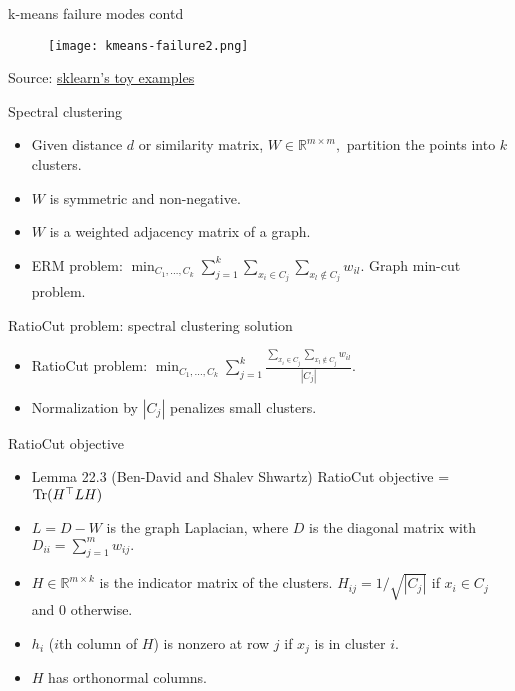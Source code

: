 \documentclass[final]{beamer}
\begin{document}
\begin{frame}{k-means failure modes contd}
	\begin{figure}
	\texttt{[image: kmeans-failure2.png]}
	\end{figure}

	Source: \href{https://scikit-learn.org/stable/auto_examples/cluster/plot_kmeans_assumptions.html\#sphx-glr-auto-examples-cluster-plot-kmeans-assumptions-py}{sklearn's toy examples}
\end{frame}
\begin{frame}{Spectral clustering}
	\begin{itemize}
		\item Given distance $d$ or similarity matrix, $W \in \mathbb{R}^{m\times m},$ partition the points into $k$ clusters.
		\pause
		\item $W$ is symmetric and non-negative.
		\pause
		\item $W$ is a weighted adjacency matrix of a graph.
		\pause
		\item ERM problem: $\min_{C_1, \ldots, C_k} \sum_{j=1}^k \sum_{x_i \in C_j} \sum_{x_l \notin C_j} w_{il}.$ Graph min-cut problem.
	\end{itemize}
\end{frame}
\begin{frame}{RatioCut problem: spectral clustering solution}
	\begin{itemize}
		\item RatioCut problem: $\min_{C_1, \ldots, C_k} \sum_{j=1}^k \frac{\sum_{x_i \in C_j} \sum_{x_l \notin C_j} w_{il}}{|C_j|}.$
		\pause
		\item Normalization by $|C_j|$ penalizes small clusters.
		\pause

	\end{itemize}

\end{frame}
\begin{frame}{RatioCut objective}
	\begin{itemize}
\item Lemma 22.3 (Ben-David and Shalev Shwartz) RatioCut objective = ${\rm Tr}(H^\top L H)$
\pause
	\item $L = D - W$ is the graph Laplacian, where $D$ is the diagonal matrix with $D_{ii} = \sum_{j=1}^m w_{ij}.$
	\pause
\item $H \in \mathbb{R}^{m\times k}$ is the indicator matrix of the clusters. $H_{ij} = 1/\sqrt{|C_j|}$ if $x_i \in C_j$ and $0$ otherwise.
	\pause
	\item $h_i$ ($i$th column of $H$) is nonzero at row $j$ if $x_j$ is in cluster $i$. 
	\pause
	\item $H$ has orthonormal columns.
	\end{itemize}
\end{frame}
\end{document}
